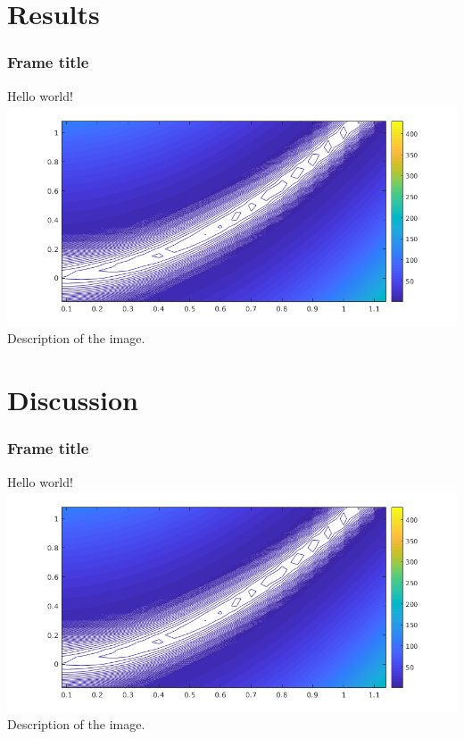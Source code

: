 \documentclass[aspectratio=169]{beamer}
\begin{document}
\section{Results}
\begin{frame}
 \frametitle{Frame title}
 Hello world!\\
 \includegraphics[scale=0.5]{images/rosenbrockzoom.png}\\
 Description of the image.
\end{frame}

\section{Discussion}
\begin{frame}
 \frametitle{Frame title}
 Hello world!\\
 \includegraphics[scale=0.5]{images/rosenbrockzoom.png}\\
 Description of the image.
\end{frame}
\end{document}
